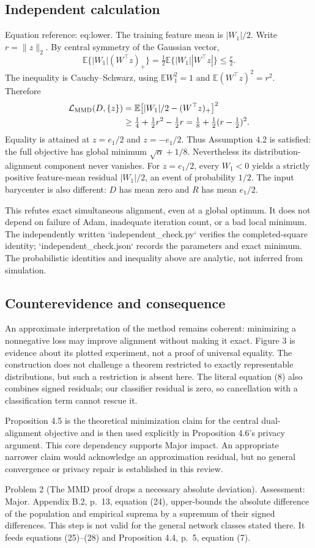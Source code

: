 \documentclass[10pt]{article}
\begin{document}
\subsection*{Independent calculation}
Equation reference: eq:lower. The training feature mean is \(|W_1|/2\). Write \(r=\|z\|_2\). By central symmetry of the Gaussian vector, \[\mathbb E\{|W_1|(W^\top z)_+\}
 =\tfrac12\mathbb E\{|W_1||W^\top z|\}\leq \tfrac r2.\] The inequality is Cauchy–Schwarz, using \(\mathbb E W_1^2=1\) and \(\mathbb E(W^\top z)^2=r^2\). Therefore \[\begin{aligned}
 \mathcal L_{\rm MMD}(D,\{z\})
 &=\mathbb E\bigl[|W_1|/2-(W^\top z)_+\bigr]^2\\
 &\geq \tfrac14+\tfrac12r^2-\tfrac12r
 =\tfrac18+\tfrac12(r-\tfrac12)^2. \end{aligned}\] Equality is attained at \(z=e_1/2\) and \(z=-e_1/2\). Thus Assumption 4.2 is satisfied: the full objective has global minimum \(\sqrt{\alpha}+1/8\). Nevertheless its distribution-alignment component never vanishes. For \(z=e_1/2\), every \(W_1<0\) yields a strictly positive feature-mean residual \(|W_1|/2\), an event of probability \(1/2\). The input barycenter is also different: \(D\) has mean zero and \(R\) has mean \(e_1/2\).\par
This refutes exact simultaneous alignment, even at a global optimum. It does not depend on failure of Adam, inadequate iteration count, or a bad local minimum. The independently written `independent\_check.py` verifies the completed-square identity; `independent\_check.json` records the parameters and exact minimum. The probabilistic identities and inequality above are analytic, not inferred from simulation.\par
\subsection*{Counterevidence and consequence}
An approximate interpretation of the method remains coherent: minimizing a nonnegative loss may improve alignment without making it exact. Figure 3 is evidence about its plotted experiment, not a proof of universal equality. The construction does not challenge a theorem restricted to exactly representable distributions, but such a restriction is absent here. The literal equation (8) also combines signed residuals; our classifier residual is zero, so cancellation with a classification term cannot rescue it.\par
Proposition 4.5 is the theoretical minimization claim for the central dual-alignment objective and is then used explicitly in Proposition 4.6’s privacy argument. This core dependency supports Major impact. An appropriate narrower claim would acknowledge an approximation residual, but no general convergence or privacy repair is established in this review.\par
Problem 2 (The MMD proof drops a necessary absolute deviation).  Assessment: Major. Appendix B.2, p. 13, equation (24), upper-bounds the absolute difference of the population and empirical suprema by a supremum of their signed differences. This step is not valid for the general network classes stated there. It feeds equations (25)–(28) and Proposition 4.4, p. 5, equation (7).\par
\end{document}

